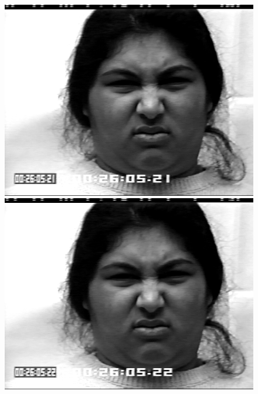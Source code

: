 \documentclass[12pt, a4paper]{report}
\begin{document}
\begin{figure}[h]
\begin{minipage}[b]{.2\linewidth}
		\includegraphics[width=\linewidth]{Bilder/Disgust9.png}
	\end{minipage}
	\hspace{.025\linewidth}%
	\begin{minipage}[b]{.2\linewidth} %
		\includegraphics[width=\linewidth]{Bilder/Disgust10.png}
	\end{minipage}
	\hspace{.025\linewidth}%
	\begin{minipage}[b]{.2\linewidth} %

\end{minipage}
\end{figure}
\end{document}
